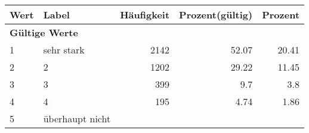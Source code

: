      \begin{longtable}{lXrrr}
     \toprule
     \textbf{Wert} & \textbf{Label} & \textbf{Häufigkeit} & \textbf{Prozent(gültig)} & \textbf{Prozent} \\
     \endhead
     \midrule
     \multicolumn{5}{l}{\textbf{Gültige Werte}}\\

     1 &
     \multicolumn{1}{X}{ sehr stark   } &


       \num{2142} &
       \num[round-mode=places,round-precision=2]{52.07} &
         \num[round-mode=places,round-precision=2]{20.41} \\

     2 &
     \multicolumn{1}{X}{ 2   } &


       \num{1202} &
       \num[round-mode=places,round-precision=2]{29.22} &
         \num[round-mode=places,round-precision=2]{11.45} \\

     3 &
     \multicolumn{1}{X}{ 3   } &


       \num{399} &
       \num[round-mode=places,round-precision=2]{9.7} &
         \num[round-mode=places,round-precision=2]{3.8} \\

     4 &
     \multicolumn{1}{X}{ 4   } &


       \num{195} &
       \num[round-mode=places,round-precision=2]{4.74} &
         \num[round-mode=places,round-precision=2]{1.86} \\

     5 &
     \multicolumn{1}{X}{ überhaupt nicht   } &



\end{longtable}
